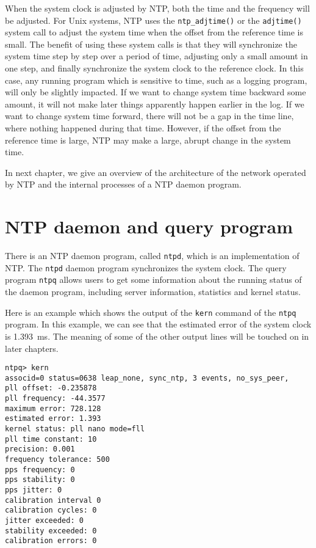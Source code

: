 When the system clock is adjusted by NTP\null, both the time and the frequency
will be adjusted. For Unix systems, NTP uses the \verb|ntp_adjtime()| or
the \verb|adjtime()| system call to adjust the system time when the offset from
the reference time is small.
The benefit of using these system calls is that they will synchronize the
system time step by
step over a period of time, adjusting only a small amount in one step, and finally
synchronize the system clock to the reference clock. In this case, any running
program which is sensitive to
time, such as a logging program, will only be slightly impacted. If we want to
change system time backward some amount, it will not make later things
apparently happen earlier in the log. If we want to change system time forward,
there will not be a gap in the time line, where nothing happened during that
time. However, if the offset from the reference time is large, NTP may make a
large, abrupt change in the system time.

In next chapter, we give an overview of the architecture of the network
operated by NTP and the internal processes of a NTP daemon program.

\section{NTP daemon and query program}%
\label{sec:ntp_daemon_and_query_program}
There is an NTP daemon program, called \verb|ntpd|, which is an implementation of
NTP\null. The \verb|ntpd| daemon program synchronizes the system clock. The
query program \verb|ntpq| allows users to get some information about the running
status of the daemon program, including server information,
statistics and kernel status.

Here is an example which shows the output of the \verb|kern| command of the
\verb|ntpq| program. In this example, we can see that the estimated error of
the system clock is 1.393~ms. The meaning of some of the other output lines
will be touched on in later chapters.
\begin{verbatim}
ntpq> kern
associd=0 status=0638 leap_none, sync_ntp, 3 events, no_sys_peer,
pll offset: -0.235878
pll frequency: -44.3577
maximum error: 728.128
estimated error: 1.393
kernel status: pll nano mode=fll
pll time constant: 10
precision: 0.001
frequency tolerance: 500
pps frequency: 0
pps stability: 0
pps jitter: 0
calibration interval 0
calibration cycles: 0
jitter exceeded: 0
stability exceeded: 0
calibration errors: 0
\end{verbatim}




